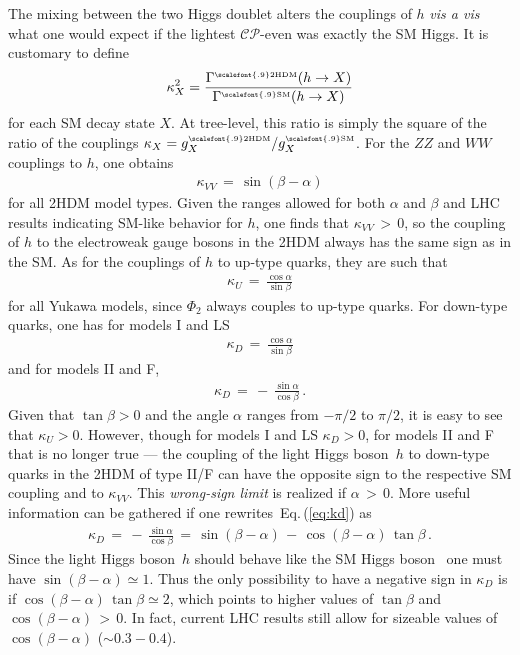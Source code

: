 \documentclass[12pt]{article}
\newcommand{\abbrev}{\scalefont{.9}}
\newcommand{\eqn}[1]{Eq.\,(\ref{#1})}
\newcommand{\lhc}{{\abbrev LHC}}
\newcommand{\sm}{{\abbrev SM}}
\newcommand{\thdm}{{\abbrev 2HDM}}
\newcommand{\cp}{{\abbrev $\mathcal{CP}$}}
\begin{document}
The mixing between the two Higgs doublet alters the couplings of $h$ {\em vis a vis} what one would expect
if the lightest \cp{}-even was exactly the \sm{} Higgs.
It is customary to define
%
\begin{align}
\kappa_X^2=\frac{\Gamma^{\scriptscriptstyle {\rm \thdm{}}}  (h \to X)}{\Gamma^{\scriptscriptstyle {\rm \sm{}}} (h \to X)}
\end{align}
%
for each \sm{} decay state $X$.
At tree-level, this ratio is simply the square of the ratio of the couplings
$\kappa_X= g_{X}^{\scriptscriptstyle {\rm \thdm{}}}   /g_{X}^{\scriptscriptstyle {\rm \sm{}}} $.
For the $ZZ$ and $WW$ couplings to $h$, one obtains
%
\begin{align}
\kappa_{VV} \,=\, \sin(\beta - \alpha)
\end{align}
%
for all \thdm{} model types.
Given the ranges allowed for both $\alpha$ and $\beta$ and \lhc{} results indicating \sm{}-like behavior for $h$,
one finds that $\kappa_{VV}\,>\,0$, so the
coupling of $h$ to the electroweak gauge bosons in the \thdm{} always has the same sign as in the \sm{}.
As for the couplings of $h$ to up-type quarks, they are such that
%
\begin{align}
\kappa_U\,=\, \frac{\cos\alpha}{\sin\beta}
\end{align}
%
for all Yukawa models, since $\Phi_2$ always couples to up-type quarks.
For down-type quarks, one has for models I and LS
%
\begin{align}
\kappa_D\,=\, \frac{\cos\alpha}{\sin\beta}
\label{eq:kd}
\end{align}
%
and for models II and F,
%
\vspace{-5mm}
\begin{align}
\kappa_D\,=\, -\,\frac{\sin\alpha}{\cos\beta}\,.
\end{align}
%
Given that $\tan\beta>0$ and the angle $\alpha$ ranges from $-\pi/2$ to $\pi/2$,  it is easy to see that $\kappa_U>0$.
However, though for models I and LS $\kappa_D>0$, for models II and F that is no longer true --- the coupling of the light Higgs boson~$h$ to down-type quarks in the \thdm{} of type II/F can have the opposite sign to the respective \sm{} coupling and to $\kappa_{VV}$.
This {\em wrong-sign limit}
\cite{Ferreira:2014naa,Ferreira:2014dya,Dumont:2014wha,Fontes:2014tga,Bernon:2014nxa,Biswas:2015zgk,Modak:2016cdm}
is realized if  $\alpha \,>\,0$. More useful information can be gathered if one rewrites~\eqn{eq:kd} as
%
\begin{align}
\kappa_D\,=\, -\,\frac{\sin\alpha}{\cos\beta}\,=\,\sin(\beta - \alpha) \,-\,
\cos(\beta - \alpha)\,\tan\beta\,.
\end{align}
%
Since the light Higgs boson~$h$ should behave like the \sm{} Higgs boson~\cite{Khachatryan:2016vau} one must have $\sin(\beta - \alpha) \simeq 1$.
Thus the only possibility to have a negative sign in $\kappa_D$ is if $\cos(\beta - \alpha)\,\tan\beta \simeq 2$, which points to higher values of $\tan\beta$  and $\cos(\beta - \alpha)\,>\,0$.
In fact, current \lhc{} results still allow for sizeable values of $\cos(\beta - \alpha)$ ($\sim  0.3-0.4$).
\end{document}
